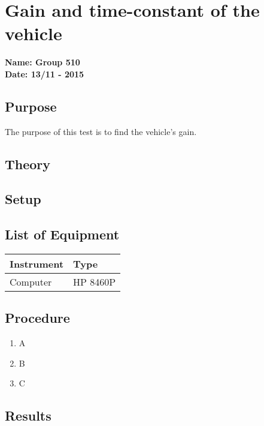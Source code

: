 \pagebreak
\section{Gain and time-constant of the vehicle} %
\textbf{Name: Group 510}\\
\textbf{Date: 13/11 - 2015}

\subsection{Purpose}
The purpose of this test is to find the vehicle's gain.

\subsection{Theory}

\subsection{Setup}

\subsection{List of Equipment}

\begin{table}[H]
\begin{tabular}{|p{10cm}|p{4cm}|}
\hline%
  \textbf{Instrument}                     &  \textbf{Type}       \\
\hline%
  Computer                                &  HP 8460P    \\
\hline %
\end{tabular}
\end{table}

\subsection{Procedure}

\begin{enumerate}
  \item A
  \item B
  \item C
\end{enumerate}

\subsection{Results}


